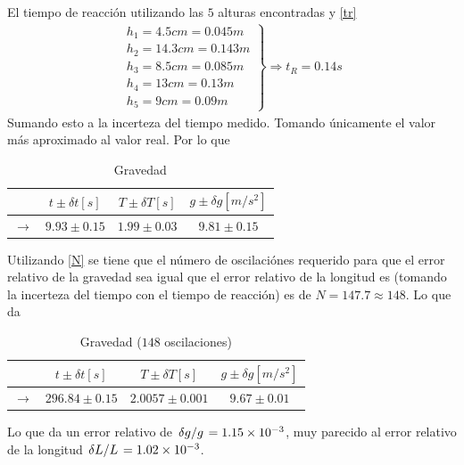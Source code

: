 \documentclass[conference]{IEEEtran}
\begin{document}
    El tiempo de reacción utilizando las $5$ alturas encontradas y \eqref{tr}
    \begin{align*}
    	\left.\begin{array}{c}
    		h_1 = 4.5 cm = 0.045 m \\
    		h_2 = 14.3 cm = 0.143 m \\
    		h_3 = 8.5 cm = 0.085 m \\
    		h_4 = 13 cm = 0.13 m \\
    		h_5 = 9 cm = 0.09 m
    	\end{array}\right\} \Rightarrow
    	t_R  = 0.14 s
    \end{align*}
    Sumando esto a la incerteza del tiempo medido. Tomando únicamente el valor más aproximado al valor real. Por lo que
    \begin{table}[H]
    	\centering
    	\caption{Gravedad}
    	\begin{tabular}{||c||c|c|c||}
    		\hline
    		\hline
    			& $t\pm \delta t [s]$ & $T \pm \delta T [s]$ & $g \pm \delta g [m/s^2]$ \\
    		\hline
    			$\to$ & $9.93 \pm 0.15$ & $1.99 \pm 0.03$ & $9.81 \pm  0.15$ \\
    		\hline
    		\hline
    	\end{tabular}
    	\label{tab:res2}
    \end{table}
    
    Utilizando \eqref{N} se tiene que el número de oscilaciónes requerido para que el error relativo de la gravedad sea igual que el error relativo de la longitud es (tomando la incerteza del tiempo con el tiempo de reacción) es de $N = 147.7 \approx 148$. Lo que da
    \begin{table}[H]
    	\centering
    	\caption{Gravedad ($148$ oscilaciones)}
    	\begin{tabular}{||c||c|c|c||}
    		\hline
    		\hline
    			& $t\pm \delta t [s]$ & $T \pm \delta T [s]$ & $g \pm \delta g [m/s^2]$ \\
    		\hline
    			$\to$ & $296.84 \pm 0.15$ & $2.0057 \pm 0.001$ & $9.67 \pm  0.01$ \\
    		\hline
    		\hline
    	\end{tabular}
    	\label{tab:res2}
    \end{table}
    Lo que da un error relativo de $\flatfrac{\delta g}{g} = 1.15\times 10^{-3}$, muy parecido al error relativo de la longitud $\flatfrac{\delta L}{L} = 1.02\times 10^{-3}$. \\
    
\end{document}
